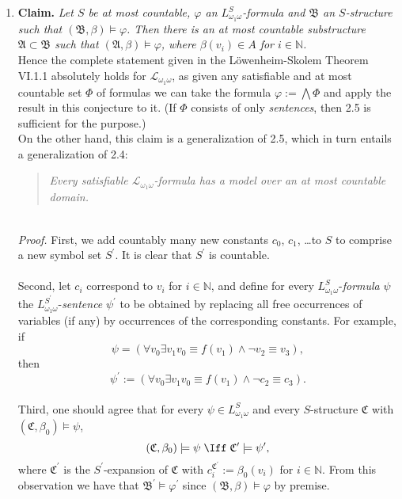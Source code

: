 \begin{enumerate}[1.]
%
\item \textbf{Claim.} \emph{Let $S$ be at most countable, $\varphi$ an $L^S_{\omega_1\omega}$-formula and $\mathfrak{B}$ an $S$-structure such that $(\mathfrak{B}, \beta) \models \varphi$. Then there is an at most countable substructure $\mathfrak{A} \subset \mathfrak{B}$ such that $(\mathfrak{A}, \beta) \models \varphi$, where $\beta(v_i) \in A$ for $i \in \mathbb{N}$.}\newline
\ 
\\Hence the complete statement given in the L\"{o}wenheim-Skolem Theorem VI.1.1 absolutely holds for $\mathcal{L}_{\omega_1\omega}$, as given any satisfiable and at most countable set $\Phi$ of formulas we can take the formula $\varphi := \bigwedge \Phi$ and apply the result in this conjecture to it. (If $\Phi$ consists of only \emph{sentences}, then 2.5 is sufficient for the purpose.)\newline
\ 
\\On the other hand, this claim is a generalization of 2.5, which in turn entails a generalization of 2.4:
\begin{quote}
\emph{Every satisfiable $\mathcal{L}_{\omega_1\omega}$-formula has a model over an at most countable domain.}
\end{quote}
\ 
\\\textit{Proof.} First, we add countably many new constants $c_0$, $c_1$, \ldots to $S$ to comprise a new symbol set $S^\prime$. It is clear that $S^\prime$ is countable.\\
\\
Second, let $c_i$ correspond to $v_i$ for $i \in \mathbb{N}$, and define for every $L^S_{\omega_1\omega}$-\emph{formula} $\psi$ the $L^{S^\prime}_{\omega_1\omega}$-\emph{sentence} $\psi^\prime$ to be obtained by replacing all free occurrences of variables (if any) by occurrences of the corresponding constants. For example, if
\[
\psi = (\forall v_0 \exists v_1 v_0 \equiv f(v_1) \land \neg v_2 \equiv v_3),
\]
then
\[
\psi^\prime := (\forall v_0 \exists v_1 v_0 \equiv f(v_1) \land \neg c_2 \equiv c_3).
\]
\ \\
Third, one should agree that for every $\psi \in L^S_{\omega_1\omega}$ and every $S$-structure $\mathfrak{C}$ with $(\mathfrak{C}, \beta_0) \models \psi$,
\[
(\mathfrak{C}, \beta_0) \models \psi \; \Iff \; \mathfrak{C}^\prime \models \psi^\prime,
\]
where $\mathfrak{C}^\prime$ is the $S^\prime$-expansion of $\mathfrak{C}$ with $c_i^{\mathfrak{C}^\prime} := \beta_0(v_i)$ for $i \in \mathbb{N}$. From this observation we have that $\mathfrak{B}^\prime \models \varphi^\prime$ since $(\mathfrak{B}, \beta) \models \varphi$ by premise.\\

\end{enumerate}

